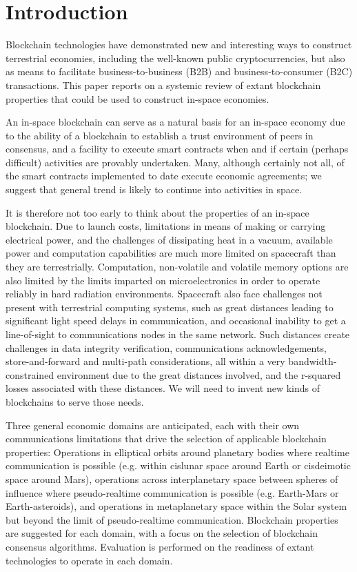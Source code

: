 \documentclass[]{aiaa-tc}%
\begin{document}
\section{Introduction}

Blockchain technologies have demonstrated new and interesting ways to construct terrestrial economies, including the well-known public cryptocurrencies, but also as means to facilitate business-to-business (B2B) and business-to-consumer (B2C) transactions. This paper reports on a systemic review of extant blockchain properties that could be used to construct in-space economies.

An in-space blockchain can serve as a natural basis for an in-space economy due to the ability of a blockchain to establish a trust environment of peers in consensus, and a facility to execute smart contracts when and if certain (perhaps difficult) activities are provably undertaken. Many, although certainly not all, of the smart contracts implemented to date execute economic agreements; we suggest that general trend is likely to continue into activities in space.

It is therefore not too early to think about the properties of an in-space blockchain. Due to launch costs, limitations in means of making or carrying electrical power, and the challenges of dissipating heat in a vacuum, available power and computation capabilities are much more limited on spacecraft than they are terrestrially. Computation, non-volatile and volatile memory options are also limited by the limits imparted on microelectronics in order to operate reliably in hard radiation environments. Spacecraft also face challenges not present with terrestrial computing systems, such as great distances leading to significant light speed delays in communication, and occasional inability to get a line-of-sight to communications nodes in the same network.  Such distances create challenges in data integrity verification, communications acknowledgements, store-and-forward and multi-path considerations, all within a very bandwidth-constrained environment due to the great distances involved, and the r-squared losses associated with these distances. We will need to invent new kinds of blockchains to serve those needs.

Three general economic domains are anticipated, each with their own communications limitations that drive the selection of applicable blockchain properties: Operations in elliptical orbits around planetary bodies where realtime communication is possible (e.g. within cislunar space around Earth or cisdeimotic space around Mars), operations across interplanetary space between spheres of influence where pseudo-realtime communication is possible (e.g. Earth-Mars or Earth-asteroids), and operations in metaplanetary space within the Solar system but beyond the limit of pseudo-realtime communication. Blockchain properties are suggested for each domain, with a focus on the selection of blockchain consensus algorithms. Evaluation is performed on the readiness of extant technologies to operate in each domain.
\end{document}

